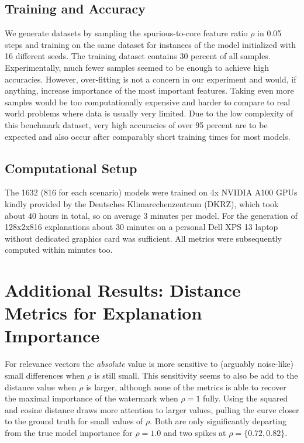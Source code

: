 \subsection{Training and Accuracy}
We generate datasets by sampling the spurious-to-core feature ratio $\rho$ in 0.05 steps and training on the same dataset for instances of the model initialized with 16 different seeds. The training dataset contains 30 percent of all samples. Experimentally, much fewer samples seemed to be enough to achieve high accuracies. However, over-fitting is not a concern in our experiment and would, if anything, increase importance of the most important features. Taking even more samples would be too computationally expensive and harder to compare to real world problems where data is usually very limited. 
Due to the low complexity of this benchmark dataset, very high accuracies of over 95 percent are to be expected and also occur after comparably short training times for most models. \\


\subsection{Computational Setup}\label{appendix:setup}
The 1632 (816 for each scenario) models were trained on 4x NVIDIA A100 GPUs kindly provided by the Deutsches Klimarechenzentrum (DKRZ), which took about 40 hours in total, so on average 3 minutes per model. 
For the generation of 128x2x816 explanations about 30 minutes on a personal Dell XPS 13 laptop without dedicated graphics card was sufficient. All metrics were subsequently computed within minutes too. 

\section{Additional Results: Distance Metrics for Explanation Importance}\label{appendix:distance_metrics}

For relevance vectors the \textit{absolute} value is more sensitive to (arguably noise-like) small differences when $\rho$ is still small. This sensitivity seems to also be add to the distance value when $\rho$ is larger, although none of the metrics is able to recover the maximal importance of the watermark when $\rho = 1$ fully. 
Using the squared and cosine distance draws more attention to larger values, pulling the curve closer to the ground truth for small values of $\rho$. 
Both are only significantly departing from the true model importance for $\rho = 1.0$ and two spikes at $\rho = \{0.72, 0.82\}$. 

